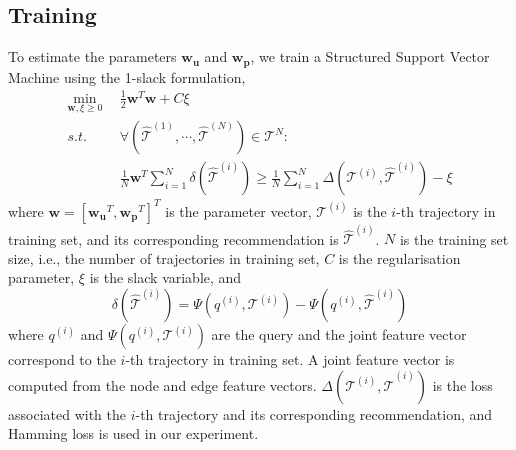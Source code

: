 \subsection{Training}
To estimate the parameters $\mathbf{w_u}$ and $\mathbf{w_p}$, we train a Structured Support Vector Machine
using the 1-slack formulation,
\begin{align*}
    \min_{\mathbf{w}, \xi \ge 0} ~~& \frac{1}{2} \mathbf{w}^T \mathbf{w} + C \xi \\
    s.t. ~~& \forall \left( \hat{\mathcal{T}}^{(1)}, \cdots, \hat{\mathcal{T}}^{(N)} \right) \in \mathscr{T}^N: \\
         ~~& \frac{1}{N} \mathbf{w}^T \sum_{i=1}^N \delta \left( \hat{\mathcal{T}}^{(i)} \right) \ge
             \frac{1}{N} \sum_{i=1}^N \Delta \left( \mathcal{T}^{(i)}, \hat{\mathcal{T}}^{(i)} \right) - \xi
\end{align*}
where $\mathbf{w} = [\mathbf{w_u}^T, \mathbf{w_p}^T]^T$ is the parameter vector,
$\mathcal{T}^{(i)}$ is the $i$-th trajectory in training set, 
and its corresponding recommendation is $\hat{\mathcal{T}}^{(i)}$.
$N$ is the training set size, i.e., the number of trajectories in training set, 
$C$ is the regularisation parameter, $\xi$ is the slack variable, and
\begin{displaymath}
    \delta \left( \hat{\mathcal{T}}^{(i)} \right) = \Psi \left( q^{(i)}, \mathcal{T}^{(i)} \right) - 
                                                    \Psi \left( q^{(i)}, \hat{\mathcal{T}}^{(i)} \right)
\end{displaymath}
where $q^{(i)}$ and $\Psi \left( q^{(i)}, \mathcal{T}^{(i)} \right)$ are the query and the joint feature vector 
correspond to the $i$-th trajectory in training set. 
A joint feature vector is computed from the node and edge feature vectors.
$\Delta \left( \mathcal{T}^{(i)}, \hat{\mathcal{T}}^{(i)} \right)$ is the loss associated with the $i$-th trajectory 
and its corresponding recommendation, and Hamming loss is used in our experiment.
